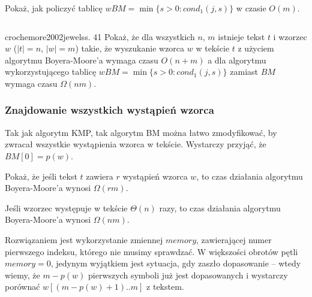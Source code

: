 
\begin{problem}{}{}
    Pokaż, jak policzyć tablicę $wBM = \min\{s > 0: cond_1(j, s)\}$ w czasie $O(m)$.
\end{problem}

\begin{code}
\inputminted{python}{code/exact-string-matching/boyer-moore.py}
\label{alg:exact-string-matching-boyer-moore}
\end{code}

\begin{problem}{crochemore2002jewels}{s. 41}
  Pokaż, że dla wszystkich $n$, $m$ istnieje tekst $t$ i wzorzec $w$ ($|t| = n$, $|w| = m$) takie, że wyszukanie wzorca $w$ w tekście $t$
  z użyciem algorytmu Boyera-Moore'a wymaga czasu $O(n + m)$ a dla algorytmu wykorzystującego tablicę $wBM = \min\{s > 0: cond_1(j, s)\}$ zamiast $BM$ wymaga czasu $\Omega(n m)$.
\end{problem}


\subsubsection{Znajdowanie wszystkich wystąpień wzorca}

Tak jak algorytm KMP, tak algorytm BM można łatwo zmodyfikować, by zwracał wszystkie wystąpienia wzorca w tekście. Wystarczy przyjąć, że $BM[0] = p(w)$.
\begin{problem}{}{}
  Pokaż, że jeśli tekst $t$ zawiera $r$ wystąpień wzorca $w$, to czas działania algorytmu Boyera-Moore'a wynosi $\Omega(r m)$.
\end{problem}

\begin{corollary}{}{}
  Jeśli wzorzec występuje w tekście $\Theta(n)$ razy, to czas działania algorytmu Boyera-Moore'a wynosi $\Omega(n m)$.
\end{corollary}

Rozwiązaniem jest wykorzystanie zmiennej $memory$, zawierającej numer pierwszego indeksu, którego nie musimy sprawdzać.
W większości obrotów pętli $memory = 0$, jedynym wyjątkiem jest sytuacja, gdy zaszło dopasowanie -- wtedy wiemy, że $m - p(w)$ pierwszych symboli już jest dopasowanych i wystarczy porównać $w[(m - p(w) + 1)..m]$ z tekstem.

\begin{code}
\inputminted{python}{code/exact-string-matching/boyer-moore-galil.py}
\label{alg:exact-string-matching-boyer-moore-galil}
\end{code}

